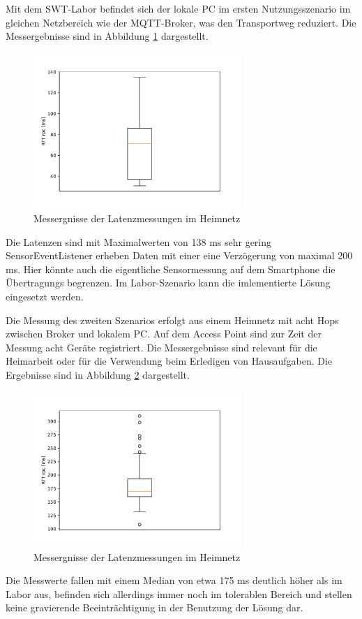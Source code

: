 \documentclass[11pt,a4paper]{report}
\begin{document}
Mit dem SWT-Labor befindet sich der lokale PC im ersten Nutzungsszenario im gleichen Netzbereich wie der MQTT-Broker, was den Transportweg reduziert.
Die Messergebnisse sind in Abbildung \ref{fig:measure_institute} dargestellt.
\begin{figure}[htbp]
  \centering
  \includegraphics[width=0.7\textwidth]{images/timing_institute.pdf}
  \caption{Messergnisse der Latenzmessungen im Heimnetz}
  \label{fig:measure_institute}
\end{figure}
Die Latenzen sind mit Maximalwerten von 138 ms sehr gering  
SensorEventListener erheben Daten mit einer eine Verzögerung von maximal 200 ms.
Hier könnte auch die eigentliche Sensormessung auf dem Smartphone die Übertragungs begrenzen.
Im Labor-Szenario kann die imlementierte Lösung eingesetzt werden.

Die Messung des zweiten Szenarios erfolgt aus einem Heimnetz mit acht Hops zwischen Broker und lokalem PC. 
Auf dem Access Point sind zur Zeit der Messung acht Geräte registriert.
Die Messergebnisse sind relevant für die Heimarbeit oder für die Verwendung beim Erledigen von Hausaufgaben.
Die Ergebnisse sind in Abbildung \ref{fig:measure_home} dargestellt.
\begin{figure}[htbp]
  \centering
  \includegraphics[width=0.7\textwidth]{images/timing_at_home}
  \caption{Messergnisse der Latenzmessungen im Heimnetz}
  \label{fig:measure_home}
\end{figure}
Die Messwerte fallen mit einem Median von etwa 175 ms deutlich höher als im Labor aus, befinden sich allerdings immer noch im tolerablen Bereich und stellen keine gravierende Beeinträchtigung in der Benutzung der Lösung dar.
\end{document}
